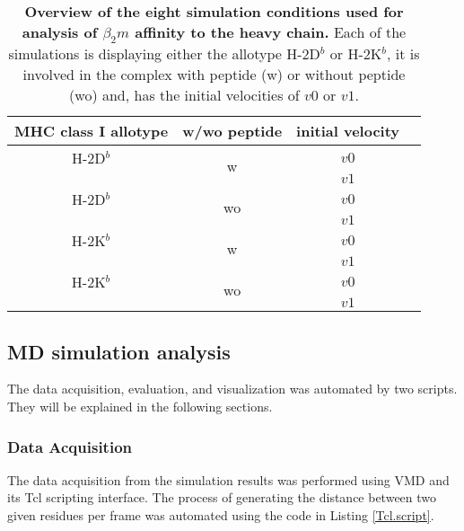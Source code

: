 \documentclass[11pt,twocolumn]{article}
\newcommand{\4}{four {\AA}ngstroms}
\begin{document}
\begin{table}[H]
\caption{\textbf{Overview of the eight simulation conditions used for analysis of $\beta_{2}m$ affinity to the heavy chain.} Each of the simulations is displaying either the allotype H-2D$^{b}$ or H-2K$^{b}$, it is involved in the complex with peptide (w) or without peptide (wo) and, has the initial velocities of $v0$ or $v1$.}
\label{simulations}
\centering 
\resizebox{0.4\textwidth}{!} {
\begin{tabular}{|c|c|c|c|}  \hline
MHC class I allotype& w/wo peptide&initial velocity\\ \hline
H-2D$^{b}$&\multirow{2}{*}{w}&$v0$\\
&&$v1$\\  \hline
H-2D$^{b}$&\multirow{2}{*}{wo}&$v0$\\
&&$v1$\\  \hline
H-2K$^{b}$&\multirow{2}{*}{w}&$v0$\\
&&$v1$\\  \hline
H-2K$^{b}$&\multirow{2}{*}{wo}&$v0$\\
&&$v1$\\  \hline

\end{tabular}
}
\end{table}

\subsection*{MD simulation analysis}

The data acquisition, evaluation, and visualization was automated by two scripts. They will be explained in the following  sections.

\subsubsection*{Data Acquisition}

The data acquisition from  the simulation results was performed using VMD and its Tcl scripting interface. The process of generating the distance between two given residues per frame was automated using the code in Listing \ref{Tcl.script}.
\end{document}
